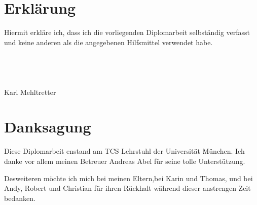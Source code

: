 \chapter*{Erkl\"arung}
Hiermit erkl\"are ich, dass ich die vorliegenden Diplomarbeit selbst\"andig verfasst und keine anderen als die angegebenen Hilfsmittel verwendet habe.
\\
\\
\\
\\
\\
{\Large Karl Mehltretter}\\

\chapter*{Danksagung}
Diese Diplomarbeit enstand am TCS Lehrstuhl der Universit\"at M\"unchen.
Ich danke vor allem meinen Betreuer Andreas Abel f\"ur seine tolle Unterst\"utzung.

Desweiteren m\"ochte ich mich bei meinen Eltern,bei Karin und Thomas, und bei Andy, Robert und Christian f\"ur ihren R\"uckhalt w\"ahrend dieser anstrengen Zeit bedanken.
